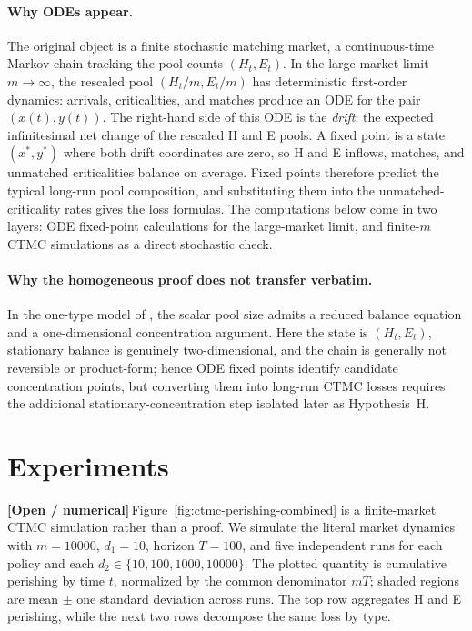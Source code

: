 \documentclass{article}
\theoremstyle{plain}
\theoremstyle{definition}
\newcommand{\open}{\textcolor{openred}{\textbf{[Open / numerical]}}\,}
\begin{document}
\paragraph{Why ODEs appear.}
The original object is a finite stochastic matching market, a continuous-time Markov chain tracking the pool counts $(H_t,E_t)$. In the large-market limit $m\to\infty$, the rescaled pool $(H_t/m,E_t/m)$ has deterministic first-order dynamics: arrivals, criticalities, and matches produce an ODE for the pair $(x(t),y(t))$. The right-hand side of this ODE is the \emph{drift}: the expected infinitesimal net change of the rescaled H and E pools. A fixed point is a state $(x^\ast,y^\ast)$ where both drift coordinates are zero, so H and E inflows, matches, and unmatched criticalities balance on average. Fixed points therefore predict the typical long-run pool composition, and substituting them into the unmatched-criticality rates gives the loss formulas. The computations below come in two layers: ODE fixed-point calculations for the large-market limit, and finite-$m$ CTMC simulations as a direct stochastic check.

\paragraph{Why the homogeneous proof does not transfer verbatim.}
In the one-type model of \cite{akbarpour}, the scalar pool size admits a reduced balance equation and a one-dimensional concentration argument. Here the state is $(H_t,E_t)$, stationary balance is genuinely two-dimensional, and the chain is generally not reversible or product-form; hence ODE fixed points identify candidate concentration points, but converting them into long-run CTMC losses requires the additional stationary-concentration step isolated later as Hypothesis~H.

\section{Experiments}\label{sec:experiments}

\open Figure~\ref{fig:ctmc-perishing-combined} is a finite-market CTMC simulation rather than a proof. We simulate the literal market dynamics with $m=10000$, $d_1=10$, horizon $T=100$, and five independent runs for each policy and each $d_2\in\{10,100,1000,10000\}$. The plotted quantity is cumulative perishing by time $t$, normalized by the common denominator $mT$; shaded regions are mean $\pm$ one standard deviation across runs. The top row aggregates H and E perishing, while the next two rows decompose the same loss by type.
\end{document}
